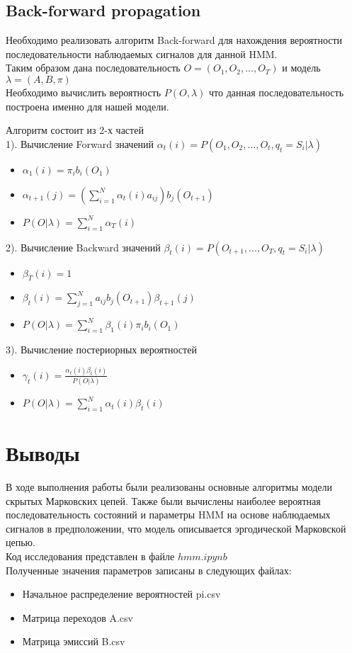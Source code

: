 \documentclass[a4paper,12pt]{article}
\theoremstyle{plain} %
\theoremstyle{definition} %
\theoremstyle{remark} %
\begin{document}
	\subsection{Back-forward propagation}
	 Необходимо реализовать алгоритм Back-forward  для нахождения вероятности последовательности наблюдаемых сигналов для данной HMM.
	\\
	Таким образом дана последовательность  $O=(O_1,O_2,...,O_T)$ и модель $\lambda = 	(A,B, \pi)$ \\
	Необходимо вычислить вероятность $P(O,\lambda)$ что данная последовательность построена именно для нашей модели.
	
	Алгоритм состоит из 2-х частей \\
	1). Вычисление Forward значений 
	$ \alpha_t(i) = P(O_1, O_2 ,... ,O_t, q_t = S_i | \lambda) $ 
	\begin{itemize}
		\item 
		$\alpha_1(i) = \pi_i b_i(O_1)$
		\item
		$\alpha_{t+1} (j) =(\sum_{i=1}^{N}\alpha_t(i)a_{ij}) b_j(O_{t+1})$
		\item
		$P(O|\lambda) = \sum_{i=1}^{N}\alpha_T(i)$
	\end{itemize} 
	2). Вычисление Backward значений 
	$\beta_t(i) = P(O_{t+1},..., O_T, q_t = S_i | \lambda) $
	\begin{itemize}
	\item
	$\beta_T(i) = 1 $
	\item
	$ \beta_t(i) = \sum_{j=1}^{N}a_{ij}b_j(O_{t+1})\beta_{t+1}(j) $ 
	\item
	$P(O|\lambda) = \sum_{i=1}^{N} \beta_1(i)\pi_i b_i(O_1)$
	\end{itemize} 
	3). Вычисление постериорных вероятностей
	\begin{itemize}
		\item
		$ \gamma_t(i) = \frac{\alpha_t(i)\beta_t(i)}{P(O|\lambda)} $ 
		\item 
		${P(O|\lambda)} =  \sum_{i=1}^{N} \alpha_t(i) \beta_t(i) $
	\end{itemize} 
	\section{Выводы}
	В ходе выполнения работы были реализованы основные алгоритмы модели скрытых Марковских цепей.
	Также были вычислены наиболее вероятная последовательность состояний и параметры HMM на основе наблюдаемых сигналов в  предположении, что модель описывается эргодической Марковской цепью. \\
    Код исследования представлен в файле $hmm.ipynb$ \\
    Полученные значения параметров записаны в следующих файлах:
    \begin{itemize}
    	\item
    	Начальное распределение вероятностей  pi.csv
    	\item
    	Матрица переходов  A.csv
    	\item
    	Матрица эмиссий  B.csv
    \end{itemize}
    
		   
	
\end{document}
